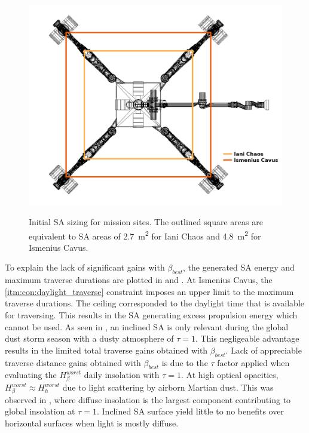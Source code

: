\begin{figure}[h]
  \captionsetup[subfigure]{justification=centering}
  \centering
  \hypersetup{linkcolor=captionTextColor}
  \includegraphics[width=1\linewidth]{sections/power-system-design/solar-array/images/sa-area-initial-sizes.png}\\
  \caption[Initial solar array sizing for mission sites]
          {Initial \ac{SA} sizing for mission sites. The outlined square areas are equivalent to \ac{SA} areas of \SI{2.7}{m^{2}} for Iani Chaos and \SI{4.8}{m^{2}} for Ismenius Cavus.}
  \label{fig:sa-area-initial-sizes}
\end{figure}

To explain the lack of significant gains with $\beta_{best}$, the generated \ac{SA} energy and maximum traverse durations are plotted in  and . At Ismenius Cavus, the \ref{itm:con:daylight_traverse} constraint imposes an upper limit to the maximum traverse durations. The ceiling corresponded to the daylight time that is available for traversing. This results in the \ac{SA} generating excess propulsion energy which cannot be used. As seen in , an inclined \ac{SA} is only relevant during the global dust storm season with a dusty atmosphere of $\tau = 1$. This negligeable advantage results in the limited total traverse gains obtained with $\beta_{best}$. Lack of appreciable traverse distance gains obtained with $\beta_{best}$ is due to the $\tau$ factor applied when evaluating the $H_{\beta}^{worst}$ daily insolation with $\tau = 1$. At high optical opacities, $H_{\beta}^{worst} \approx H_{h}^{worst}$ due to light scattering by airborn Martian dust. This was observed in , where diffuse insolation is the largest component contributing to global insolation at $\tau = 1$. Inclined \ac{SA} surface yield little to no benefits over horizontal surfaces when light is mostly diffuse.

